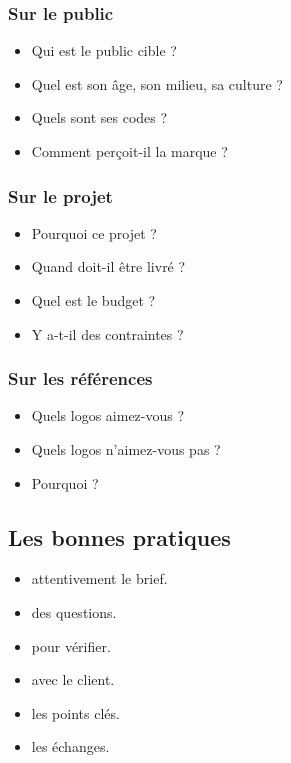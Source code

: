\subsubsection{Sur le public}

\begin{itemize}
    \item Qui est le public cible ?
    \item Quel est son âge, son milieu, sa culture ?
    \item Quels sont ses codes ?
    \item Comment perçoit-il la marque ?
\end{itemize}

\subsubsection{Sur le projet}

\begin{itemize}
    \item Pourquoi ce projet ?
    \item Quand doit-il être livré ?
    \item Quel est le budget ?
    \item Y a-t-il des contraintes ?
\end{itemize}

\subsubsection{Sur les références}

\begin{itemize}
    \item Quels logos aimez-vous ?
    \item Quels logos n'aimez-vous pas ?
    \item Pourquoi ?
\end{itemize}

\subsection{Les bonnes pratiques}

\begin{itemize}
    \item {} attentivement le brief.
    \item {} des questions.
    \item {} pour vérifier.
    \item {} avec le client.
    \item {} les points clés.
    \item {} les échanges.
\end{itemize}

